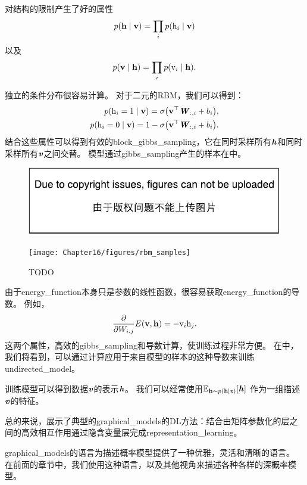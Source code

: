 对结构的限制产生了好的属性
\begin{align}
\label{eqn:1611}
p(\mathbf{h}\mid\mathbf{v}) = \prod_i p(\mathrm{h}_i\mid \mathbf{v})
\end{align}
以及
\begin{align}
\label{eqn:1612}
p(\mathbf{v}\mid\mathbf{h}) = \prod_i p(\mathrm{v}_i\mid \mathbf{h}).
\end{align}


独立的条件分布很容易计算。
对于二元的\gls{RBM}，我们可以得到：
\begin{align}
\label{eqn:1613}
\begin{aligned}
p(\mathrm{h}_i = 1\mid\mathbf{v}) = \sigma\big(\mathbf{v}^{\top}\boldsymbol{\mathit{W}}_{:,i} + b_i\big),\\
p(\mathrm{h}_i = 0\mid\mathbf{v}) = 1 - \sigma\big(\mathbf{v}^{\top}\boldsymbol{\mathit{W}}_{:,i} + b_i\big).\\
\end{aligned}
\end{align}
结合这些属性可以得到有效的\gls{block_gibbs_sampling}，它在同时采样所有$\boldsymbol{\mathit{h}}$和同时采样所有$\boldsymbol{\mathit{v}}$之间交替。
模型通过\gls{gibbs_sampling}产生的样本在中。

\begin{figure}[!htb]
\ifOpenSource
\centerline{\includegraphics{figure.pdf}}
\else
	\centerline{\texttt{[image: Chapter16/figures/rbm\_samples]}}	
\fi
	\caption{TODO}
	\label{fig:rbm_sample}
\end{figure}


由于\gls{energy_function}本身只是参数的线性函数，很容易获取\gls{energy_function}的导数。 例如，
\begin{align}
\label{eqn:1615}
\frac{\partial}{\partial W_{i,j}} E(\mathbf{v},\mathbf{h}) = - \mathrm{v}_i \mathrm{h}_j.
\end{align}
这两个属性，高效的\gls{gibbs_sampling}和导数计算，使训练过程非常方便。
在中，我们将看到，可以通过计算应用于来自模型的样本的这种导数来训练\gls{undirected_model}。

训练模型可以得到数据$\boldsymbol{\mathit{v}}$的表示$\boldsymbol{\mathit{h}}$。
我们可以经常使用$\mathbb{E}_{\mathbf{h}\sim p(\mathbf{h}\mid\boldsymbol{\mathit{v}})}[\boldsymbol{\mathit{h}}]$ 作为一组描述$\boldsymbol{\mathit{v}}$的特征。



总的来说，展示了典型的\gls{graphical_models}的\gls{DL}方法：结合由矩阵参数化的层之间的高效相互作用通过隐含变量层完成\gls{representation_learning}。


\gls{graphical_models}的语言为描述概率模型提供了一种优雅，灵活和清晰的语言。 在前面的章节中，我们使用这种语言，以及其他视角来描述各种各样的深概率模型。




